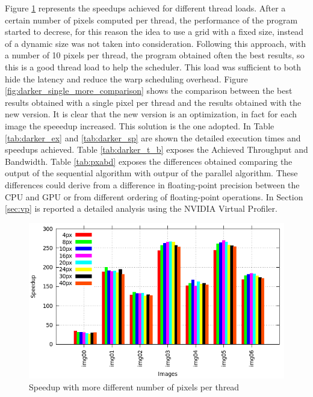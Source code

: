 \documentclass[a4paper]{article}
\begin{document}
Figure \ref{fig:darker_try_histo} represents the speedups achieved for different thread loads. After a certain number of pixels computed per thread, the performance of the program started to decrese, for this reason the idea to use a grid with a fixed size, instead of a dynamic size was not taken into consideration. Following this approach, with a number of 10 pixels per thread, the program obtained often the best results, so this is a good thread load to help the scheduler. This load was sufficient to both hide the latency and reduce the warp scheduling overhead. Figure \ref{fig:darker_single_more_comparison} shows the comparison between the best results obtained with a single pixel per thread and the results obtained with the new version. It is clear that the new version is an optimization, in fact for each image the speeedup increased. This solution is the one adopted. In Table \ref{tab:darker_ex} and \ref{tab:darker_sp} are shown the detailed execution times and speedups achieved. Table \ref{tab:darker_t_b} exposes the Achieved Throughput and Bandwidth. Table \ref{tab:pxabd} exposes the differences obtained comparing the output of the sequential algorithm with outpur of the parallel algorithm. These differences could derive from a difference in floating-point precision between the CPU and GPU or from different ordering of floating-point operations. In Section \ref{sec:vp} is reported a detailed analysis using the NVIDIA Virtual Profiler.
    
\begin{figure}[!ht]
    \centering
    \includegraphics[width=0.9\linewidth]{res/new/darker_try_histo}
    \caption{Speedup with more different number of pixels per thread}
    \label{fig:darker_try_histo}
\end{figure}
\FloatBarrier
\end{document}
